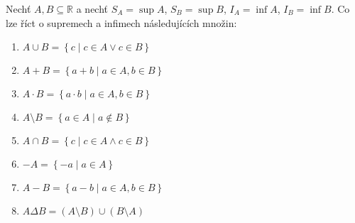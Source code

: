 Nechť $A, B \subseteq \mathbb{R}$ a nechť $S_A = \sup A$, $S_B = \sup B$, $I_A = \inf A$, $I_B = \inf B$.
Co lze říct o supremech a infimech následujících množin:
\begin{enumerate}
	\item  $A \cup B = \left\{ c \mid c \in A \vee c \in B \right\}$
	\item  $A + B = \left\{ a+b \mid a \in A, b \in B \right\}$
	\item  $A \cdot B = \left\{ a \cdot b \mid a \in A, b \in B \right\}$
	\item  $A \setminus B = \left\{ a \in A \mid a \not\in B \right\}$
	\item  $A \cap B = \left\{ c \mid c \in A \wedge c \in B \right\}$
	\item  $-A = \left\{ -a \mid a \in A \right\}$
	\item  $A - B = \left\{ a-b \mid a \in A, b \in B \right\}$
	\item  $A \Delta B = (A \setminus B) \cup (B \setminus A)$
\end{enumerate}

